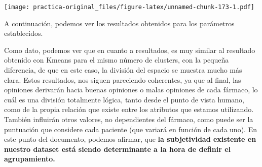 \documentclass[spanish,]{article}
\newenvironment{Shaded}{\begin{snugshade}}{\end{snugshade}}
\newcommand{\KeywordTok}[1]{\textcolor[rgb]{0.13,0.29,0.53}{\textbf{#1}}}
\newcommand{\DataTypeTok}[1]{\textcolor[rgb]{0.13,0.29,0.53}{#1}}
\newcommand{\DecValTok}[1]{\textcolor[rgb]{0.00,0.00,0.81}{#1}}
\newcommand{\StringTok}[1]{\textcolor[rgb]{0.31,0.60,0.02}{#1}}
\newcommand{\CommentTok}[1]{\textcolor[rgb]{0.56,0.35,0.01}{\textit{#1}}}
\newcommand{\OtherTok}[1]{\textcolor[rgb]{0.56,0.35,0.01}{#1}}
\newcommand{\OperatorTok}[1]{\textcolor[rgb]{0.81,0.36,0.00}{\textbf{#1}}}
\newcommand{\NormalTok}[1]{#1}
\begin{document}
\texttt{[image: practica-original\_files/figure-latex/unnamed-chunk-173-1.pdf]}

\begin{Shaded}
\end{Shaded}

A continuación, podemos ver los resultados obtenidos para los parámetros
establecidos.

Como dato, podemos ver que en cuanto a resultados, es muy similar al
resultado obtenido con Kmeans para el mismo número de clusters, con la
pequeña diferencia, de que en este caso, la división del espacio se
muestra mucho más clara. Estos resultados, nos siguen pareciendo
coherentes, ya que al final, las opiniones derivarán hacia buenas
opiniones o malas opiniones de cada fármaco, lo cuál es una división
totalmente lógica, tanto desde el punto de vista humano, como de la
propia relación que existe entre los atributos que estamos utilizando.
También influirán otros valores, no dependientes del fármaco, como puede
ser la puntuación que considere cada paciente (que variará en función de
cada uno). En este punto del documento, podemos afirmar, que \textbf{la
subjetividad existente en nuestro dataset está siendo determinante a la
hora de definir el agrupamiento. }

\begin{Shaded}
\end{Shaded}
\end{document}
